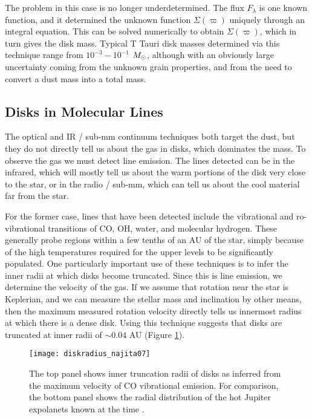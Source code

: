 The problem in this case is no longer underdetermined. The flux $F_{\lambda}$ is one known function, and it determined the unknown function $\Sigma(\varpi)$ uniquely through an integral equation. This can be solved numerically to obtain $\Sigma(\varpi)$, which in turn gives the disk mass. Typical T Tauri disk masses determined via this technique range from $10^{-3}-10^{-1}$ $M_{\odot}$, although with an obviously large uncertainty coming from the unknown grain properties, and from the need to convert a dust mass into a total mass.

\subsection{Disks in Molecular Lines}

The optical and IR / sub-mm continuum techniques both target the dust, but they do not directly tell us about the gas in disks, which dominates the mass. To observe the gas we must detect line emission. The lines detected can be in the infrared, which will mostly tell us about the warm portions of the disk very close to the star, or in the radio / sub-mm, which can tell us about the cool material far from the star.

For the former case, lines that have been detected include the vibrational and ro-vibrational transitions of CO, OH, water, and molecular hydrogen. These generally probe regions within a few tenths of an AU of the star, simply because of the high temperatures required for the upper levels to be significantly populated. One particularly important use of these techniques is to infer the inner radii at which disks become truncated. Since this is line emission, we determine the velocity of the gas. If we assume that rotation near the star is Keplerian, and we can measure the stellar mass and inclination by other means, then the maximum measured rotation velocity directly tells us innermost radius at which there is a dense disk. Using this technique suggests that disks are truncated at inner radii of $\sim 0.04$ AU (Figure \ref{fig:diskradius_najita07}).

\begin{figure}
\texttt{[image: diskradius\_najita07]}
\caption[Inner disk radii from CO line emission]{
\label{fig:diskradius_najita07}
The top panel shows inner truncation radii of disks as inferred from the maximum velocity of CO vibrational emission. For comparison, the bottom panel shows the radial distribution of the hot Jupiter expolanets known at the time \citep{najita07a}.
}
\end{figure}

